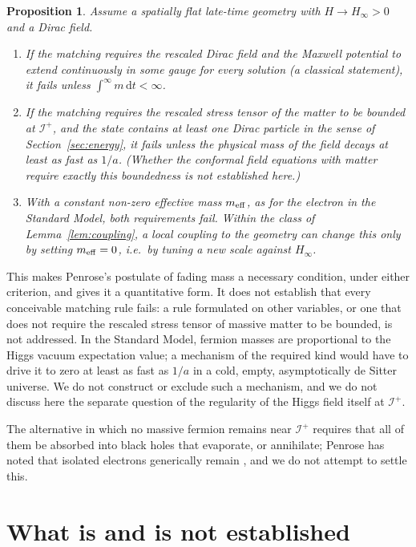 \documentclass[11pt,a4paper]{article}
\newtheorem{proposition}{Proposition}
\theoremstyle{definition}
\newcommand{\scri}{\mathscr{I}^{+}}
\newcommand{\dd}{\mathrm{d}}
\begin{document}
\begin{proposition}
\label{prop:ccc}
Assume a spatially flat late-time geometry with $H\to H_{\infty}>0$ and a Dirac field.
\begin{enumerate}[label=(\alph*)]
\item If the matching requires the rescaled Dirac field and the Maxwell potential to extend continuously in some gauge for every solution (a classical statement), it fails unless $\int^{\infty}m\,\dd t<\infty$.
\item If the matching requires the rescaled stress tensor of the matter to be bounded at $\scri$, and the state contains at least one Dirac particle in the sense of Section~\ref{sec:energy}, it fails unless the physical mass of the field decays at least as fast as $1/a$. (Whether the conformal field equations with matter require exactly this boundedness is not established here.)
\item With a constant non-zero effective mass $m_{\rm eff}$, as for the electron in the Standard Model, both requirements fail. Within the class of Lemma~\ref{lem:coupling}, a local coupling to the geometry can change this only by setting $m_{\rm eff}=0$, i.e.\ by tuning a new scale against $H_{\infty}$.
\end{enumerate}
\end{proposition}

This makes Penrose's postulate of fading mass a necessary condition, under either criterion, and gives it a quantitative form. It does not establish that every conceivable matching rule fails: a rule formulated on other variables, or one that does not require the rescaled stress tensor of massive matter to be bounded, is not addressed. In the Standard Model, fermion masses are proportional to the Higgs vacuum expectation value; a mechanism of the required kind would have to drive it to zero at least as fast as $1/a$ in a cold, empty, asymptotically de Sitter universe. We do not construct or exclude such a mechanism, and we do not discuss here the separate question of the regularity of the Higgs field itself at $\scri$.

The alternative in which no massive fermion remains near $\scri$ requires that all of them be absorbed into black holes that evaporate, or annihilate; Penrose has noted that isolated electrons generically remain \cite{Penrose2010}, and we do not attempt to settle this.

\section{What is and is not established}
\label{sec:scope}
\end{document}
